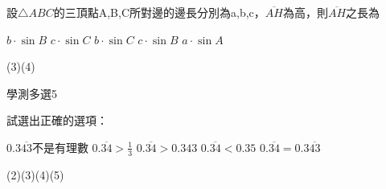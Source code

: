 \begin{QUESTIONS}
\begin{QUESTION}
        \begin{QBODY}
            設$\triangle ABC$的三頂點A,B,C所對邊的邊長分別為a,b,c，$\overline{AH}$為高，則$\overline{AH}$之長為
            \begin{QOPS}
                \QOP $b\cdot \sin B$
                \QOP $c\cdot \sin C$
                \QOP $b\cdot \sin C$
                \QOP $c\cdot \sin B$
                \QOP $a\cdot \sin A$
            \end{QOPS}
        \end{QBODY}
        \begin{QFROMS}
        \end{QFROMS}
        \begin{QTAGS}\end{QTAGS}
        \begin{QANS}
            (3)(4)
        \end{QANS}
        \begin{QSOLLIST}
        \end{QSOLLIST}
        \begin{QEMPTYSPACE}
        \end{QEMPTYSPACE}
    \end{QUESTION}
    \begin{QUESTION}
        \begin{ExamInfo}{88}{學測}{多選}{5}
        \end{ExamInfo}
        \begin{ExamAnsRateInfo}{}{}{}{}
        \end{ExamAnsRateInfo}
        \begin{QBODY}
            試選出正確的選項：
            \begin{QOPS}
                \QOP $0.3\overline{43}$不是有理數
                \QOP $0.\overline{34}>\frac{1}{3}$	
                \QOP $0.\overline{34}>0.343$
                \QOP $0.\overline{34}<0.35$
                \QOP $0.\overline{34}=0.3\overline{43}$
            \end{QOPS}    
        \end{QBODY}
        \begin{QFROMS}
        \end{QFROMS}
        \begin{QTAGS}\end{QTAGS}
        \begin{QANS}
            (2)(3)(4)(5)
        \end{QANS}
        \begin{QSOLLIST}
        \end{QSOLLIST}

\end{QUESTION}
\end{QUESTIONS}

